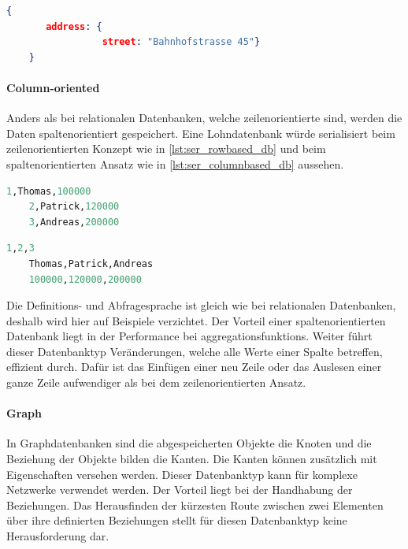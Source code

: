 \begin{lstlisting}[language=JSON, caption=Resultat der Abfrage in MongoDB, label=lst:select_result_mongodb]  
    {
       address: {
                 street: "Bahnhofstrasse 45"}
    }
\end{lstlisting}

\paragraph{Column-oriented}
Anders als bei relationalen Datenbanken, welche zeilenorientierte sind, werden die Daten spaltenorientiert gespeichert. Eine Lohndatenbank würde serialisiert beim zeilenorientierten Konzept
wie in \autoref{lst:ser_rowbased_db} und beim spaltenorientierten Ansatz wie in \autoref{lst:ser_columnbased_db} aussehen.

\begin{lstlisting}[language=SQL, caption=Serialisierung zeilenorientierte Datenbank, label=lst:ser_rowbased_db]  
    1,Thomas,100000
    2,Patrick,120000
    3,Andreas,200000
\end{lstlisting}

\begin{lstlisting}[language=SQL, caption=Serialisierung spaltenorientierte Datenbank, label=lst:ser_columnbased_db]  
    1,2,3
    Thomas,Patrick,Andreas
    100000,120000,200000
\end{lstlisting}

Die Definitions- und Abfragesprache ist gleich wie bei relationalen Datenbanken, deshalb wird hier auf Beispiele verzichtet. Der Vorteil 
einer spaltenorientierten Datenbank liegt in der Performance bei \glspl{aggregationsfunktion}. Weiter führt dieser Datenbanktyp Veränderungen, 
welche alle Werte einer Spalte betreffen, effizient durch. Dafür ist das Einfügen einer neu Zeile oder das Auslesen einer ganze Zeile aufwendiger als bei dem zeilenorientierten Ansatz.

\paragraph{Graph}
In Graphdatenbanken sind die abgespeicherten Objekte die Knoten und die Beziehung der Objekte bilden die Kanten. Die Kanten können zusätzlich mit Eigenschaften versehen werden. Dieser 
Datenbanktyp kann für komplexe Netzwerke verwendet werden. Der Vorteil liegt bei der Handhabung der Beziehungen. Das Herausfinden der kürzesten Route zwischen zwei Elementen über 
ihre definierten Beziehungen stellt für diesen Datenbanktyp keine Herausforderung dar.

